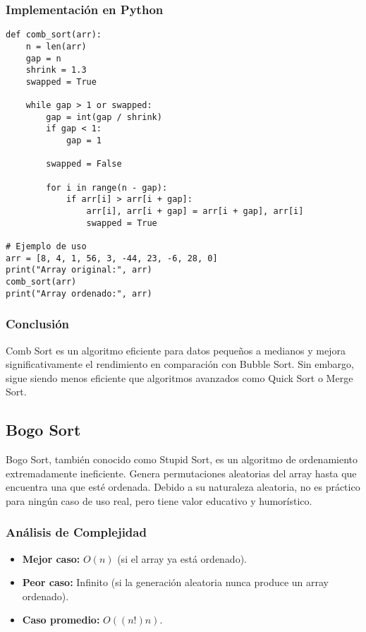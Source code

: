 \documentclass[11pt,openany]{book}
\begin{document}
\subsubsection{Implementación en Python}
\lstset{language=Python}
\begin{lstlisting}
def comb_sort(arr):
    n = len(arr)
    gap = n
    shrink = 1.3
    swapped = True

    while gap > 1 or swapped:
        gap = int(gap / shrink)
        if gap < 1:
            gap = 1

        swapped = False

        for i in range(n - gap):
            if arr[i] > arr[i + gap]:
                arr[i], arr[i + gap] = arr[i + gap], arr[i]
                swapped = True

# Ejemplo de uso
arr = [8, 4, 1, 56, 3, -44, 23, -6, 28, 0]
print("Array original:", arr)
comb_sort(arr)
print("Array ordenado:", arr)
\end{lstlisting}

\subsubsection{Conclusión}
Comb Sort es un algoritmo eficiente para datos pequeños a medianos y mejora significativamente el rendimiento en comparación con Bubble Sort. Sin embargo, sigue siendo menos eficiente que algoritmos avanzados como Quick Sort o Merge Sort.


\subsection{Bogo Sort}
Bogo Sort, también conocido como Stupid Sort, es un algoritmo de ordenamiento extremadamente ineficiente. Genera permutaciones aleatorias del array hasta que encuentra una que esté ordenada. Debido a su naturaleza aleatoria, no es práctico para ningún caso de uso real, pero tiene valor educativo y humorístico.

\subsubsection{Análisis de Complejidad}
\begin{itemize}
    \item \textbf{Mejor caso:} $O(n)$ (si el array ya está ordenado).
    \item \textbf{Peor caso:} Infinito (si la generación aleatoria nunca produce un array ordenado).
    \item \textbf{Caso promedio:} $O((n!)n)$.
\end{itemize}
\end{document}
